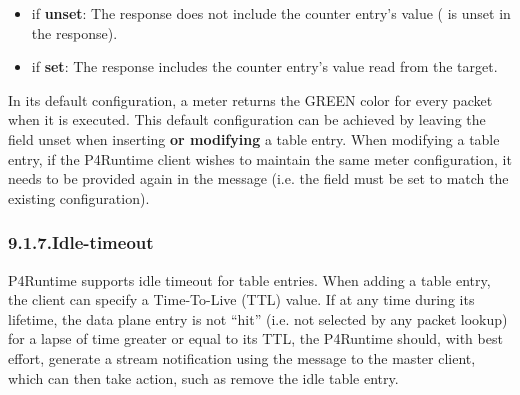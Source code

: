 \documentclass[11pt]{article}
\begin{document}
{\begin{itemize}
\begin{itemize}[noitemsep,topsep=\mdcompacttopsep]
\begin{itemize}[noitemsep,topsep=\mdcompacttopsep]
\item{}if \textbf{unset}: The response does not include the counter entry's value
( is unset in the response).%

\item{}if \textbf{set}: The response includes the counter entry's value read from
the target.%
\end{itemize}%
\end{itemize}%
\end{itemize}%

\noindent{}In its default configuration, a meter returns the GREEN color for every packet
when it is executed. This default configuration can be achieved by leaving the
 field unset when inserting \textbf{or modifying} a table entry. When
modifying a table entry, if the P4Runtime client wishes to maintain the same
meter configuration, it needs to be provided again in the  message
(i.e. the  field must be set to match the existing configuration).%

\subsubsection{9.1.7.\hspace*{0.5em}Idle-timeout}\label{sec-idle-timeout}%

\noindent{}P4Runtime supports idle timeout for table entries. When adding a table entry,
the client can specify a Time-To-Live (TTL) value. If at any time during its
lifetime, the data plane entry is not \textquotedblleft{}hit\textquotedblright{} (i.e. not selected by any packet
lookup) for a lapse of time greater or equal to its TTL, the P4Runtime should,
with best effort, generate a stream notification \textemdash{} using the
 message \textemdash{} to the master client, which can then take
action, such as remove the idle table entry.%

}
\end{document}
